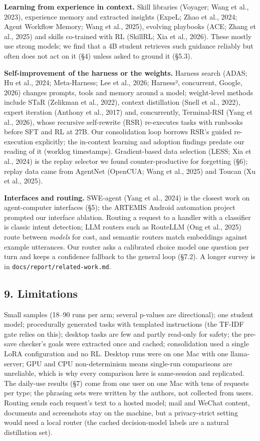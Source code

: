 \documentclass[
  10pt,
]{article}
\begin{document}
\textbf{Learning from experience in context.} Skill libraries (Voyager;
Wang et al., 2023), experience memory and extracted insights (ExpeL;
Zhao et al., 2024; Agent Workflow Memory; Wang et al., 2025), evolving
playbooks (ACE; Zhang et al., 2025) and skills co-trained with RL
(SkillRL; Xia et al., 2026). These mostly use strong models; we find
that a 4B student retrieves such guidance reliably but often does not
act on it (§4) unless asked to ground it (§5.3).

\textbf{Self-improvement of the harness or the weights.} Harness search
(ADAS; Hu et al., 2024; Meta-Harness; Lee et al., 2026; Harness²,
concurrent, Google, 2026) changes prompts, tools and memory around a
model; weight-level methods include STaR (Zelikman et al., 2022),
context distillation (Snell et al., 2022), expert iteration (Anthony et
al., 2017) and, concurrently, Terminal-RSI (Yang et al., 2026), whose
recursive self-rewrite (RSR) re-executes tasks with runbooks before SFT
and RL at 27B. Our consolidation loop borrows RSR's guided re-execution
explicitly; the in-context learning and adoption findings predate our
reading of it (worklog timestamps). Gradient-based data selection (LESS;
Xia et al., 2024) is the replay selector we found counter-productive for
forgetting (§6); replay data came from AgentNet (OpenCUA; Wang et al.,
2025) and Toucan (Xu et al., 2025).

\textbf{Interfaces and routing.} SWE-agent (Yang et al., 2024) is the
closest work on agent-computer interfaces (§5); the ARTEMIS Android
automation project prompted our interface ablation. Routing a request to
a handler with a classifier is classic intent detection; LLM routers
such as RouteLLM (Ong et al., 2025) route between \emph{models} for
cost, and semantic routers match embeddings against example utterances.
Our router asks a calibrated choice model one question per turn and
keeps a confidence fallback to the general loop (§7.2). A longer survey
is in \texttt{docs/report/related-work.md}.

\subsection{9. Limitations}\label{limitations}

Small samples (18--90 runs per arm; several p-values are directional);
one student model; procedurally generated tasks with templated
instructions (the TF-IDF gate relies on this); desktop tasks are few and
partly read-only for safety; the pre-save checker's goals were extracted
once and cached; consolidation used a single LoRA configuration and no
RL. Desktop runs were on one Mac with one llama-server; GPU and CPU
non-determinism means single-run comparisons are unreliable, which is
why every comparison here is same-session and replicated. The daily-use
results (§7) come from one user on one Mac with tens of requests per
type; the phrasing sets were written by the authors, not collected from
users. Routing sends each request's text to a hosted model; mail and
WeChat content, documents and screenshots stay on the machine, but a
privacy-strict setting would need a local router (the cached
decision-model labels are a natural distillation set).
\end{document}
